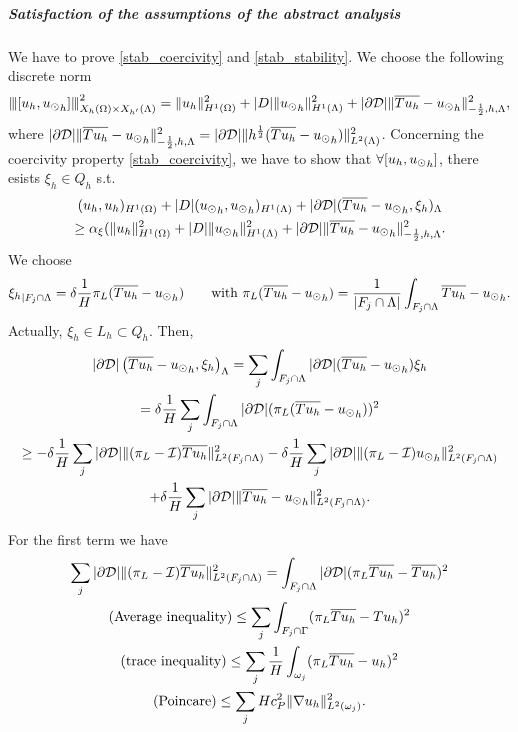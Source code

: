 \subparagraph{Satisfaction of the assumptions of the 
abstract analysis} 
We have to prove \eqref{stab_coercivity} and \eqref{stab_stability}.
We choose the following discrete norm
\begin{equation*}
{\left\vert\kern-0.25ex\left\vert\kern-0.25ex\left\vert [u_h, {u_{\odot}}_h] \right\vert\kern-0.25ex\right\vert\kern-0.25ex\right\vert}^2_{X_h(\Omega)\times X_{h'}(\Lambda) }
= \|u_h\|^2_{H^1(\Omega)}+|D|\|{u_{\odot}}_h\|^2_{H^1(\Lambda)} + |\partial\mathcal{D}|\|\overline{Tu_h} - {u_{\odot}}_h\|^2_{-\frac 12, h, \Lambda},
\end{equation*}
where $|\partial\mathcal{D}|\|\overline{Tu_h} - {u_{\odot}}_h\|^2_{-\frac 12, h, \Lambda} = |\partial\mathcal{D}|\|h^{\frac 12} (\overline{Tu_h} - {u_{\odot}}_h)\|^2_{L^2(\Lambda)} $.
Concerning the coercivity property \eqref{stab_coercivity}, we have to show that $\forall [u_h, {u_{\odot}}_h]$, there esists $\xi_h \in Q_h$ s.t.
\begin{multline*}
(u_h,u_h)_{H^1(\Omega)}+ |D|({u_{\odot}}_h, {u_{\odot}}_h)_{H^1(\Lambda)} +  |\partial\mathcal{D}| (\overline{Tu_h} - {u_{\odot}}_h, \xi_h)_{\Lambda} \\
\geq \alpha_{\xi}(\|u_h\|^2_{H^1(\Omega)}+|D|\|{u_{\odot}}_h\|^2_{H^1(\Lambda)}+ |\partial\mathcal{D}|\|\overline{Tu_h} - {u_{\odot}}_h\|^2_{-\frac 12, h, \Lambda}.
\end{multline*}
We choose 
\begin{equation*}
{\xi_h}_{|F_j\cap \Lambda}=\delta \frac 1H \pi_L(\overline{Tu_h}-{u_{\odot}}_h) \qquad \text{with } \pi_L(\overline{Tu_h}-{u_{\odot}}_h) =\frac{1}{|F_j\cap \Lambda|}\int_{F_j\cap \Lambda} \overline{Tu_h}- {u_{\odot}}_h.
\end{equation*}
Actually, $\xi_h\in L_h \subset Q_h$. Then,
\begin{multline*}
|\partial\mathcal{D}|\left( \overline{Tu_h} - {u_{\odot}}_h, \xi _h \right)_{\Lambda} 
= \sum_j \int_{F_j\cap \Lambda} |\partial\mathcal{D}|( \overline{Tu_h} - {u_{\odot}}_h)\xi_h
\\
= \delta \frac{1}{H} \sum_j \int_{F_j\cap \Lambda}|\partial\mathcal{D}| (\pi_L( \overline{Tu_h} - {u_{\odot}}_h) )^2
\\
\geq -\delta \frac 1H \sum_j|\partial\mathcal{D}| \|(\pi_L - \mathcal{I})\overline{Tu_h}\|^2_{L^2(F_j\cap \Lambda)}
- \delta \frac 1H \sum_j |\partial\mathcal{D}|\|(\pi_L - \mathcal{I}){u_{\odot}}_h\|^2_{L^2(F_j\cap \Lambda)}
\\ 
+ \delta \frac 1H \sum_j |\partial\mathcal{D}|\|\overline{Tu_h}-{u_{\odot}}_h\|^2_{L^2(F_j\cap \Lambda)}. 
\end{multline*}
For the first term we have
\begin{multline*}
\sum _j |\partial\mathcal{D}| \|(\pi_L - \mathcal{I})\overline{Tu_h}\|^2_{L^2(F_j\cap \Lambda)} =\int _{F_j \cap \Lambda} |\partial\mathcal{D}| (\pi_L \overline{Tu_h}- \overline{Tu_h})^2
\\
(\text{Average inequality)} \leq \sum _j  \int_{F_j \cap \Gamma} (\pi_L \overline{Tu_h} -Tu_h)^2 
\\
(\text{trace inequality}) \leq \sum _j  \frac 1H \int_{\omega_j}(\pi_L \overline{Tu_h} - u_h)^2 
\\ 
(\text{Poincare})\leq \sum _j  H c_P ^2 \|\nabla u_h\|^2_{L^2(\omega _j)}.
\end{multline*}
